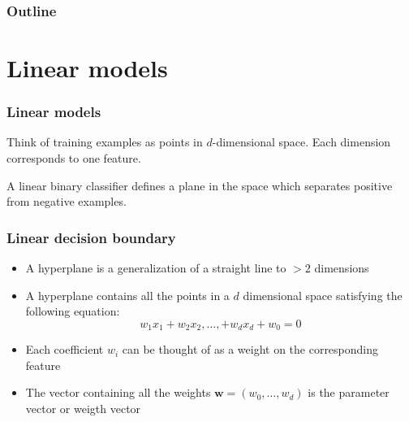 \documentclass[14pt,mathserif]{beamer}
\author[Chrupala and Stroppa]{Grzegorz Chrupa{\l}a and Nicolas Stroppa}
\institute[Saarland+Google] %
{
Saarland University\\
Google
}
\date[2010] %
{META Workshop}
\newcommand{\w}{\mathbf{w}}
\begin{document}
\frame{\titlepage}

\begin{frame}
  \frametitle{Outline}
  \tableofcontents
\end{frame}

\section{Linear models}

\begin{frame}
  \frametitle{Linear models}
  \begin{block}{}
    Think of training examples as points in $d$-dimensional
    space. Each dimension corresponds to one feature.
  \end{block}
  \begin{block}{}
    A linear binary classifier defines a plane in the space which
    separates positive from negative examples. 
  \end{block}

\end{frame}

\begin{frame}
 \frametitle{Linear decision boundary}
\begin{itemize}
\item A \alert{hyperplane} is a generalization of a straight line to
  $>2$ dimensions
\item A hyperplane contains all the points in a $d$ dimensional space satisfying the following equation:
\[
 w_1x_1 + w_2x_2, \ldots, + w_dx_d + w_0 = 0
\]
\item Each coefficient $w_i$ can be thought of as a weight on the
  corresponding feature
\item The vector containing all the weights $\w = (w_0,\ldots,w_d)$ is the
  \alert{parameter vector} or \alert{weigth vector}
\end{itemize}
\end{frame}
\end{document}
